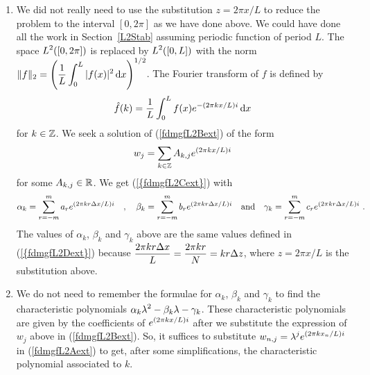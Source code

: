 \begin{rmkList}
\begin{enumerate}
We have (\ref{fdmgfL2Aext}) with $a_0 = 1$, $b_{-1} = b_1 = \alpha$,
$b_0 = 2(1-\alpha)$, $c_0 = -1$ and all the other $a_r$, $b_r$ and
$c_r$ null.  Hence
\[
\alpha_k = 1 \quad , \quad
\beta_k = \alpha e^{-k\dtx{z}\, i}
+ 2(1-\alpha) + \alpha e^{k \dtx{z} \, i} \quad \text{and}
\quad \gamma_k = -1 \ .
\]
We have to find the roots of the characteristics polynomials
\begin{align}
p_k(\lambda) &= \alpha_k \lambda^2 - \beta_k \lambda  - \gamma_k
= \lambda^2 - \left( \alpha e^{-k\dtx{z} \, i}
+ 2(1-\alpha) + \alpha e^{k \dtx{z} \, i} \right) \lambda + 1 \nonumber \\
&= \lambda^2 -\left(2 - 2\alpha\big(1+\cos( k \dtx{z})\big) \right) \lambda + 1
= \lambda^2 - \left( 2 -4 \alpha \sin^2\left( \frac{k \dtx{z}}{2}
  \right) \right)\lambda + 1 \label{fdmgfL2Cext}
\end{align}
for $0 \leq k < N$.  Let
\[
  \delta_k = 1 - 2\alpha \sin^2\left( \frac{k \dtx{z}}{2} \right) \ .
\]
We get $\DS p_k(\lambda) = \lambda^2 - 2\delta_k \lambda +1$
as in the proof of Proposition~\ref{CFLCondProp}.  Proceeding as was done in
that proof, we get
\[
  \alpha = \left(\frac{2\pi c \dtx{t}}{L \dtx{z}}\right)^2
  = \left( \frac{c \dtx{t}}{\dtx{x}}\right)^2 < 1 \ .
\]
We have a strict inequality because $\alpha = 1$ is associated to a
root of absolute value $1$ but multiplicity $2$ for $p_k$.
\item  We did not really need to use the substitution $z = 2\pi x/L$
to reduce the problem to the interval $[0,2\pi]$ as we have done
above.   We could have done all the work in Section~\ref{L2Stab}
assuming periodic function of period $L$.  The space
$\displaystyle L^2([0,2\pi])$ is replaced by
$\displaystyle L^2([0,L])$ with the norm
$\displaystyle \|f\|_2 =
\left( \frac{1}{L} \int_0^L |f(x)|^2 \,\mathrm{d}x \right)^{1/2}$.  The Fourier
transform of $f$ is defined by
\[
\hat{f}(k) =
\frac{1}{L} \int_0^L f(x) e^{-(2\pi k x/L)i} \,\mathrm{d}x
\]
for $k \in \mathbb{Z}$.  We seek a solution of (\ref{fdmgfL2Bext}) of the form
\[
  w_j = \sum_{k\in \mathbb{Z}} A_{k,j} e^{(2\pi k x/L) i}
\]
for some $A_{k,j} \in \mathbb{R}$.   We get (\ref{{fdmgfL2Cext}}) with
\[
\alpha_k = \sum_{r=-m}^m a_r e^{(2\pi k r \Delta{x}/L) i} \quad , \quad
\beta_k = \sum_{r=-m}^m b_r  e^{(2\pi k r \Delta{x}/L) i} \quad \text{and} \quad
\gamma_k = \sum_{r=-m}^m c_r  e^{(2\pi k r \Delta{x}/L) i} \ .
\]
The values of $\alpha_k$, $\beta_k$ and $\gamma_k$ above are the
same values defined in (\ref{{fdmgfL2Dext}}) because
$\displaystyle \frac{2\pi k r \Delta{x}}{L} = 
\frac{2\pi k r}{N} = k r \Delta{z}$, where $z=2\pi x /L$ is the
substitution above.
\item We do not need to remember the formulae for $\alpha_k$, $\beta_k$
and $\gamma_k$ to find the characteristic polynomials
$\displaystyle \alpha_k \lambda^2 - \beta_k \lambda - \gamma_k$.  These
characteristic polynomials are given by the coefficients of
$\displaystyle e^{(2\pi k x/L) i}$ after we substitute the expression
of $w_j$ above in (\ref{fdmgfL2Bext}).  So, it suffices to substitute
$\displaystyle w_{n,j} = \lambda^j e^{(2\pi k x_n/L) i}$ in
(\ref{fdmgfL2Aext}) to get, after some simplifications, the
characteristic polynomial associated to $k$.


\end{enumerate}
\end{rmkList}
